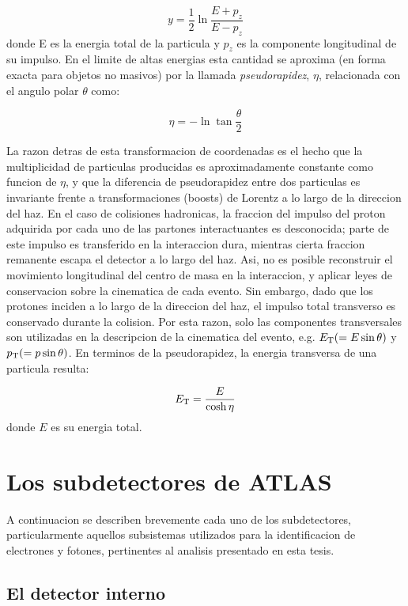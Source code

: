 \begin{equation}
  y = \frac{1}{2} \ln \frac{E+p_z}{E-p_z}
\end{equation}
%
donde E es la energia total de la particula y $p_z$ es la componente longitudinal de su impulso.
En el limite de altas energias esta cantidad se aproxima (en forma exacta para objetos no masivos)
por la llamada \emph{pseudorapidez}, $\eta$, relacionada con el angulo polar $\theta$ como:

\begin{equation}
  \eta = - \ln \tan \frac{\theta}{2}
\end{equation}

La razon detras de esta transformacion de coordenadas es el hecho que la multiplicidad de particulas
producidas es aproximadamente constante como funcion de $\eta$, y que la
diferencia de pseudorapidez entre dos particulas es invariante frente a transformaciones
(boosts) de Lorentz a lo largo de la direccion del haz. En el caso de colisiones hadronicas,
la fraccion del impulso del proton adquirida por cada uno de las partones interactuantes
es desconocida; parte de este impulso es transferido en la interaccion dura, mientras cierta
fraccion remanente escapa el detector a lo largo del haz. Asi, no es posible reconstruir el
movimiento longitudinal del centro de masa en la interaccion, y aplicar leyes de conservacion
sobre la cinematica de cada evento. Sin embargo, dado que los protones inciden a lo
largo de la direccion del haz, el impulso total transverso es conservado durante la colision.
Por esta razon, solo las componentes transversales son utilizadas en la descripcion de la
cinematica del evento, e.g. $E_{\mathrm{T}} (= E \sin \theta)$ y $p_{\mathrm{T}} (= p \sin \theta)$.
En terminos de la pseudorapidez, la energia transversa de una particula resulta:


\begin{equation}
  \et = \frac{E}{\cosh \eta}
\end{equation}
%
donde $E$ es su energia total.


\section{Los subdetectores de ATLAS}

A continuacion se describen brevemente cada uno de los subdetectores, particularmente
aquellos subsistemas utilizados para la identificacion de electrones y fotones, pertinentes
al analisis presentado en esta tesis.

\subsection{El detector interno}

